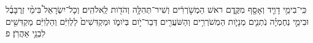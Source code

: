 \documentclass{openreader}
\begin{document}
כִּֽי־בִימֵ֥י דָוִ֛יד וְאָסָ֖ף מִקֶּ֑דֶם ראשׁ הַמְשֹׁ֣רְרִ֔ים וְשִׁיר־תְּהִלָּ֥ה וְהֹדֹ֖ות לֵֽאלֹהִֽים׃ 
וְכָל־יִשְׂרָאֵל֩ בִּימֵ֨י זְרֻבָּבֶ֜ל וּבִימֵ֣י נְחֶמְיָ֗ה נֹֽתְנִ֛ים מְנָיֹ֛ות הַמְשֹׁרְרִ֥ים וְהַשֹּׁעֲרִ֖ים דְּבַר־יֹ֣ום בְּיֹומֹ֑ו וּמַקְדִּשִׁים֙ לַלְוִיִּ֔ם וְהַלְוִיִּ֔ם מַקְדִּשִׁ֖ים לִבְנֵ֥י אַהֲרֹֽן׃ פ 
\end{document}
